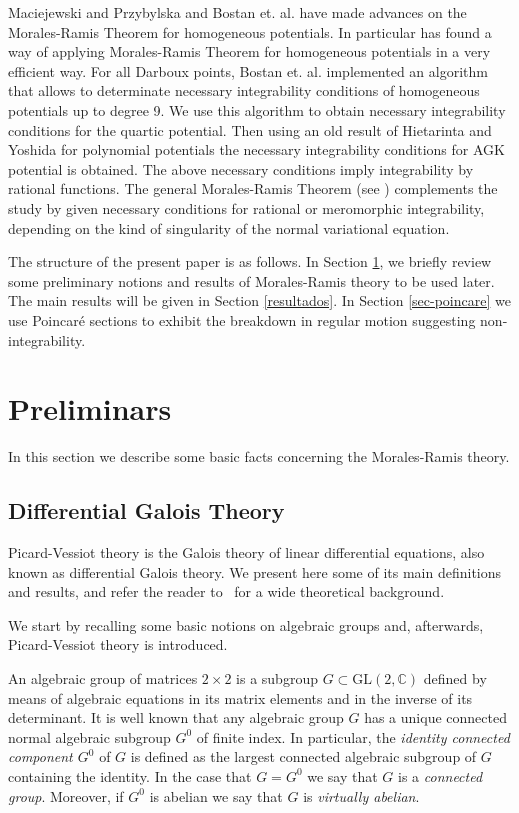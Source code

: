 \documentclass[final]{siamart0516}
\begin{document}
Maciejewski and Przybylska \cite{maria}  and Bostan et. al. \cite{combot}  have made advances on the Morales-Ramis Theorem for homogeneous potentials. In particular \cite{combot} has found a way of applying Morales-Ramis Theorem for homogeneous potentials in a very efficient way.  
For all Darboux points, Bostan et. al. \cite{combot} implemented an algorithm that allows to determinate 
necessary integrability conditions  of homogeneous  potentials up to degree 9.
We use this  algorithm to obtain necessary integrability conditions for the quartic potential.
Then using an old result of Hietarinta \cite{hietarinta} and  Yoshida \cite{yoshida} for polynomial potentials   the necessary integrability conditions  for AGK potential is obtained.
 The above necessary conditions imply  integrability by rational functions. The general Morales-Ramis 
 Theorem (see \cite{morales}) complements the study by given necessary conditions for rational or meromorphic integrability, depending on the kind of singularity of the normal variational  equation.
 
The structure of the present paper is as follows. In Section \ref{sec1}, we briefly review some preliminary
notions and results of Morales-Ramis theory to be used later. The main results will be given in
Section \ref{resultados}.  
In Section \ref{sec-poincare} we use Poincar\'e sections to exhibit the breakdown in regular motion suggesting non-integrability.


\section{Preliminars}\label{sec1}
In this section we describe  some basic facts concerning the Morales-Ramis theory. 

\subsection{Differential Galois Theory}
Picard-Vessiot theory is the Galois theory of linear differential
equations, also known as differential Galois theory. We present here some of its main definitions and results, and  refer the reader to~\cite{vasi} for a wide theoretical background.

We start by recalling some basic notions on algebraic groups and, afterwards, Picard-Vessiot theory is introduced.
    
An algebraic group of matrices $2\times 2$ is a subgroup $G\subset\mathrm{GL}(2,\mathbb{C})$
defined by means of algebraic equations in its matrix elements and in the inverse of its determinant. 
    It is well known that any algebraic group $G$ has a unique connected normal
    algebraic subgroup $G^0$ of finite index. In particular, the
    \emph{identity connected component $G^0$} of $G$ is defined as the largest connected
    algebraic subgroup of $G$ containing the identity. In the case that $G=G^0$ we say that $G$ is a
    \emph{connected group}. Moreover, if $G^0$ is abelian we say that $G$ is \emph{virtually abelian}.
    
\end{document}
